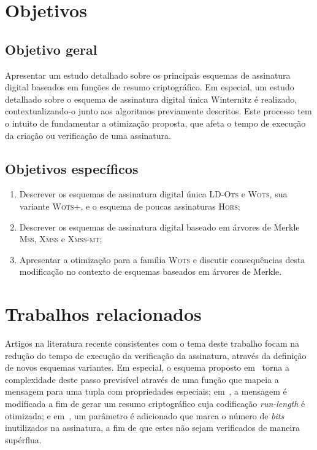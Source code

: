 \documentclass{ufsctex/ufsctex}
\newcommand{\lots}{\textsc{LD-Ots}}
\newcommand{\wots}{\textsc{Wots}}
\newcommand{\wotsplus}{\textsc{Wots+}}
\newcommand{\hors}{\textsc{Hors}}
\newcommand{\mss}{\textsc{Mss}}
\newcommand{\xmss}{\textsc{Xmss}}
\newcommand{\xmssmt}{\textsc{Xmss-mt}}
\begin{document}
\section{Objetivos}\label{section:objectives}

\subsection{Objetivo geral}\label{subsection:general}

Apresentar um estudo detalhado sobre os principais esquemas de assinatura
digital baseados em funções de resumo criptográfico. Em especial, um estudo
detalhado sobre o esquema de assinatura digital única Winternitz é realizado,
contextualizando-o junto aos algoritmos previamente descritos. Este processo
tem o intuito de fundamentar a otimização proposta, que afeta o tempo de
execução da criação ou verificação de uma assinatura.

\subsection{Objetivos específicos}\label{subsection:specific}

\begin{enumerate}[label=\roman*.]

  \item Descrever os esquemas de assinatura digital única \lots{} e \wots{},
      sua variante \wotsplus{}, e o esquema de poucas assinaturas \hors{};

  \item Descrever os esquemas de assinatura digital baseado em árvores de
      Merkle \mss{}, \xmss{} e \xmssmt{};

  \item Apresentar a otimização para a família \wots{} e discutir consequências
      desta modificação no contexto de esquemas baseados em árvores de Merkle.

\end{enumerate}

\section{Trabalhos relacionados}\label{section:related}

Artigos na literatura recente consistentes com o tema deste trabalho focam na
redução do tempo de execução da verificação da assinatura, através da definição
de novos esquemas variantes. Em especial, o esquema proposto
em~\cite{Cruz:inproc:2016:oct} torna a complexidade deste passo previsível
através de uma função que mapeia a mensagem para uma tupla com propriedades
especiais; em~\cite{Steinwandt:article:2008:oct}, a mensagem é modificada a fim
de gerar um resumo criptográfico cuja codificação \emph{run-length} é
otimizada; e em~\cite{McGrew:report:2018:apr}, um parâmetro é adicionado que
marca o número de \emph{bits} inutilizados na assinatura, a fim de que estes
não sejam verificados de maneira supérflua.
\end{document}
